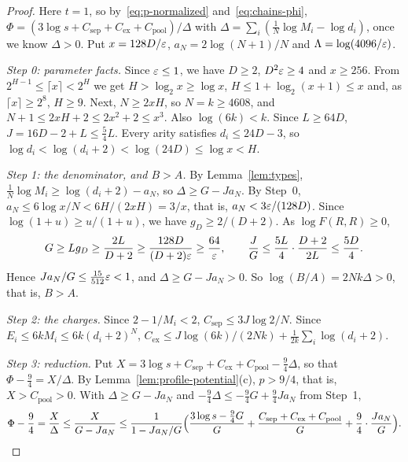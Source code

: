 \begin{proof}
Here \(t=1\), so by~\eqref{eq:p-normalized}
and~\eqref{eq:chains-phi},
\(\Phi=(3\log s+C_{\mathrm{sep}}+C_{\mathrm{ex}}+C_{\mathrm{pool}})/\Delta\)
with \(\Delta=\sum_i(\frac1N\log M_i-\log d_i)\), once we know
\(\Delta>0\). Put \(x=128D/\varepsilon\), \(a_N=2\log(N+1)/N\) and
\(\Lambda=\log(4096/\varepsilon)\).

\emph{Step 0: parameter facts.} Since \(\varepsilon\le1\), we have \(D\ge2\),
\(D^2\varepsilon\ge4\) and \(x\ge256\). From
\(2^{H-1}\le\lceil x\rceil<2^H\) we get \(H>\log_2x\ge\log x\),
\(H\le1+\log_2(x+1)\le x\) and, as \(\lceil x\rceil\ge2^8\), \(H\ge9\).
Next, \(N\ge2xH\), so \(N=k\ge4608\), and
\(N+1\le2xH+2\le2x^2+2\le x^3\). Also \(\log(6k)<k\). Since
\(L\ge64D\), \(J=16D-2+L\le\frac54L\). Every arity satisfies
\(d_i\le24D-3\), so \(\log d_i<\log(d_i+2)<\log(24D)\le\log x<H\).

\emph{Step 1: the denominator, and \(B>A\).} By
Lemma~\ref{lem:types}, \(\frac1N\log M_i\ge\log(d_i+2)-a_N\), so
\(\Delta\ge G-Ja_N\). By Step~0, \(a_N\le6\log x/N<6H/(2xH)=3/x\), that
is, \(a_N<3\varepsilon/(128D)\). Since \(\log(1+u)\ge u/(1+u)\), we have
\(g_D\ge2/(D+2)\). As \(\log F(R,R)\ge0\),
\[
 G\ge Lg_D\ge\frac{2L}{D+2}\ge\frac{128D}{(D+2)\varepsilon}\ge\frac{64}{\varepsilon},
 \qquad
 \frac JG\le\frac{5L}4\cdot\frac{D+2}{2L}\le\frac{5D}4 .
\]
Hence \(Ja_N/G\le\frac{15}{512}\varepsilon<1\), and \(\Delta\ge G-Ja_N>0\). So
\(\log(B/A)=2Nk\Delta>0\), that is, \(B>A\).

\emph{Step 2: the charges.} Since \(2-1/M_i<2\),
\(C_{\mathrm{sep}}\le3J\log2/N\). Since \(E_i\le6kM_i\le6k(d_i+2)^N\),
\(C_{\mathrm{ex}}\le J\log(6k)/(2Nk)+\frac1{2k}\sum_i\log(d_i+2)\).

\emph{Step 3: reduction.} Put
\(X=3\log s+C_{\mathrm{sep}}+C_{\mathrm{ex}}+C_{\mathrm{pool}}-\frac94\Delta\),
so that \(\Phi-\frac94=X/\Delta\). By
Lemma~\ref{lem:profile-potential}(c), \(p>9/4\), that is,
\(X>C_{\mathrm{pool}}>0\). With \(\Delta\ge G-Ja_N\) and
\(-\frac94\Delta\le-\frac94G+\frac94Ja_N\) from Step~1,
\[
 \Phi-\frac94=\frac X\Delta\le\frac X{G-Ja_N}
 \le\frac1{1-Ja_N/G}\Bigl(\frac{3\log s-\frac94G}G
 +\frac{C_{\mathrm{sep}}+C_{\mathrm{ex}}+C_{\mathrm{pool}}}G
 +\frac94\cdot\frac{Ja_N}G\Bigr).
\]


\end{proof}
